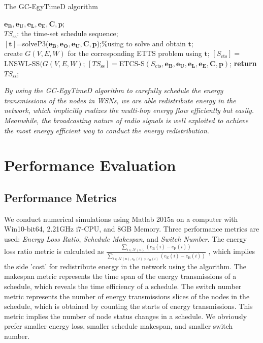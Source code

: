 \documentclass[journal,10pt]{IEEEtran}
\begin{document}
\begin{algorithm}[!htb]
\caption{The GC-EgyTimeD algorithm}
\begin{algorithmic}[1]\label{Alg_EgyTimeD}
    \REQUIRE $\mathbf{e_B}, \mathbf{e_U}, \mathbf{e_L}, \mathbf{e_E}, \mathbf{C}, \mathbf{p}$;\\
    \ENSURE $TS_\text{ss}$: the time-set schedule sequence;\\
    \STATE $[\mathbf{t}]${=}solveP3($\mathbf{e_B}, \mathbf{e_O},\mathbf{e_U},\mathbf{C}, \mathbf{p}$);\%using  to solve and obtain $\mathbf{t}$;\\
    \STATE create $G(V,E,W)$ for the corresponding ETTS problem using $\mathbf{t}$;
    \STATE $[S_\text{cts}]{=}$LNSWL-SS$(G(V,E,W)$;
    \STATE $[TS_\text{ss}]{=}$ETCS-S$(S_\text{cts},\mathbf{e_B}, \mathbf{e_U}, \mathbf{e_L}, \mathbf{e_E}, \mathbf{C}, \mathbf{p})$;
    \STATE \textbf{return} $TS_\text{ss}$;
\end{algorithmic}
\end{algorithm}

\textit{By using the GC-EgyTimeD algorithm to carefully schedule the energy transmissions of the nodes in WSNs, we are able redistribute energy in the network, which implicitly realizes the multi-hop energy flow efficiently but easily. Meanwhile, the broadcasting nature of radio signals is well exploited to achieve the most energy efficient way to conduct the energy redistribution}.

\section{Performance Evaluation}
\label{sec_sim}
\subsection{Performance Metrics}
We conduct numerical simulations using Matlab 2015a on a computer with Win10-bit64, 2.21GHz i7-CPU, and 8GB Memory. Three performance metrics are used: \textit{Energy Loss Ratio}, \textit{Schedule Makespan}, and \textit{Switch Number}. The energy loss ratio metric is calculated as  $\frac{\sum_{i{\in}\mathcal{N}(n)}(e_\text{B}(i){-}e_\text{F}(i))}{\sum_{i{\in}\mathcal{N}(n),e_\text{E}(i){>}e_\text{B}(i)}(e_\text{E}(i){-}e_\text{B}(i))}$   , which implies the side 'cost' for redistribute energy in the network using the algorithm. The makespan metric represents the time span of the energy transmissions of a schedule, which reveals the time efficiency of a schedule. The switch number metric represents the number of energy transmissions slices of the nodes in the schedule, which is obtained by counting the starts of energy transmissions. This metric implies the number of node status changes in a schedule. We obviously prefer smaller energy loss, smaller schedule makespan, and smaller switch number.
\end{document}
